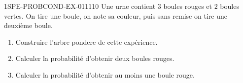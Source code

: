 \begin{exercice}{1SPE-PROBCOND-EX-011}{1}{10}
Une urne contient $3$ boules rouges et $2$ boules vertes. On tire une boule, on note sa couleur, puis sans remise on tire une deuxième boule.

\begin{enumerate}
  \item Construire l'arbre pondere de cette expérience.
  \item Calculer la probabilité d'obtenir deux boules rouges.
  \item Calculer la probabilité d'obtenir au moins une boule rouge.
\end{enumerate}
\end{exercice}
